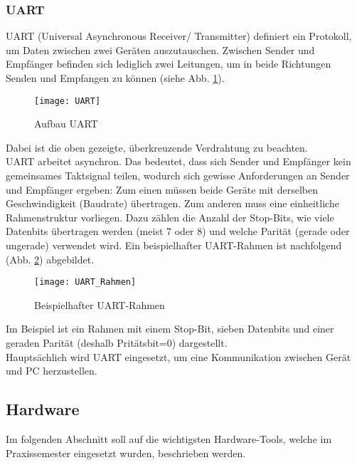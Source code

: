 \documentclass[
	letterpaper, %
	10pt, %
]{CSUniSchoolLabReport}
\begin{document}
\begin{spacing}{1.6}
\subsubsection{UART}
UART (Universal Asynchronous Receiver/ Transmitter) definiert ein Protokoll, um Daten zwischen zwei Geräten auszutauschen. Zwischen Sender und Empfänger befinden sich lediglich zwei Leitungen, um in beide Richtungen Senden und Empfangen zu können (siehe Abb. \ref{fig:UART}). 
\begin{figure}[H]
    \centering
    \texttt{[image: UART]}
    \caption{Aufbau UART \cite{UART}}
    \label{fig:UART}
\end{figure}
Dabei ist die oben gezeigte, \glqq überkreuzende\grqq $ $ Verdrahtung zu beachten.\\
UART arbeitet asynchron. Das bedeutet, dass sich Sender und Empfänger kein gemeinsames Taktsignal teilen, wodurch sich gewisse Anforderungen an Sender und Empfänger ergeben: Zum einen müssen beide Geräte mit derselben Geschwindigkeit (Baudrate) übertragen. Zum anderen muss eine einheitliche Rahmenstruktur vorliegen. 
Dazu zählen die Anzahl der Stop-Bits, wie viele Datenbits übertragen werden (meist 7 oder 8) und welche Parität (gerade oder ungerade) verwendet wird. Ein beispielhafter UART-Rahmen ist nachfolgend (Abb. \ref{fig:UART_Rahmen}) abgebildet.
\begin{figure}[H]
    \centering
    \texttt{[image: UART\_Rahmen]}
    \caption{Beispielhafter UART-Rahmen \cite{UART}}
    \label{fig:UART_Rahmen}
\end{figure}
Im Beispiel ist ein Rahmen mit einem Stop-Bit, sieben Datenbits und einer geraden Parität (deshalb Pritätsbit=0) dargestellt.\\

Hauptsächlich wird UART eingesetzt, um eine Kommunikation zwischen Gerät und PC herzustellen.

\subsection{Hardware}
Im folgenden Abschnitt soll auf die wichtigsten Hardware-Tools, welche im Praxissemester eingesetzt wurden, beschrieben werden.

\end{spacing}
\end{document}
